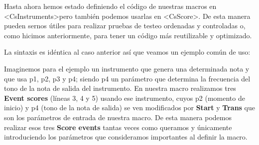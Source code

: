 Hasta ahora hemos estado definiendo el código de nuestras macros en \textless CsInstruments\textgreater pero también podemos usarlas en \textless CsScore\textgreater. De esta manera pueden sernos útiles para realizar pruebas de testeo ordenadas y controladas o, como hicimos anteriormente, para tener un código más reutilizable y optimizado.

La sintaxis es idéntica al caso anterior así que veamos un ejemplo común de uso:


Imaginemos para el ejemplo un instrumento que genera una determinada nota y que usa p1, p2, p3 y p4; siendo p4 un parámetro que determina la frecuencia del tono de la nota de salida del instrumento. En nuestra macro realizamos tres \textbf{Event scores} (líneas 3, 4 y 5) usando ese instrumento, cuyos p2 (momento de inicio) y p4 (tono de la nota de salida) se ven modificados por \textbf{Start} y \textbf{Trans} que son los parámetros de entrada de nuestra macro. De esta manera podemos realizar esos tres \textbf{Score events} tantas veces como queramos y únicamente introduciendo los parámetros que consideramos importantes al definir la macro.
